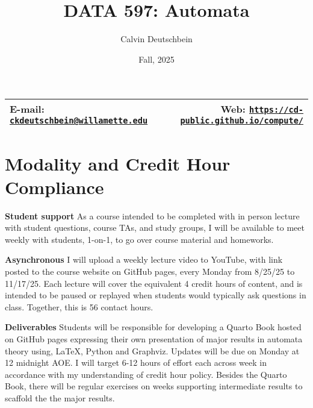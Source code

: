 \documentclass[11pt]{article}
\title{DATA 597: Automata}
\author{Calvin Deutschbein}
\date{Fall, 2025}
\newcommand{\blankline}{\quad\pagebreak[2]}
\begin{document}
\maketitle

\blankline

\begin{tabular*}{.93\textwidth}{@{\extracolsep{\fill}}lr}


E-mail: \href{mailto:ckdeutschbein@willamette.edu}{\tt\bf ckdeutschbein@willamette.edu} & Web: \href{https://cd-public.github.io/compute/}{\tt\bf https://cd-public.github.io/compute/}  \\
\hline
\end{tabular*}

\vspace{5 mm}


\section*{Modality and Credit Hour Compliance}

\bigskip

\textbf{Student support} As a course intended to be completed with in person lecture with student questions, course TAs, and study groups, I will be available to meet weekly with students, 1-on-1, to go over course material and homeworks.

\bigskip

\textbf{Asynchronous} I will upload a weekly lecture video to YouTube, with link posted to the course website on GitHub pages, every Monday from 8/25/25 to 11/17/25. Each lecture will cover the equivalent 4 credit hours of content, and is intended to be paused or replayed when students would typically ask questions in class. Together, this is 56 contact hours.

\bigskip

\textbf{Deliverables} Students will be responsible for developing a Quarto Book hosted on GitHub pages expressing their own presentation of major results in automata theory using, LaTeX, Python and Graphviz. Updates will be due on Monday at 12 midnight AOE. I will target 6-12 hours of effort each across week in accordance with my understanding of credit hour policy. Besides the Quarto Book, there will be regular exercises on weeks supporting intermediate results to scaffold the the major results.
\end{document}

